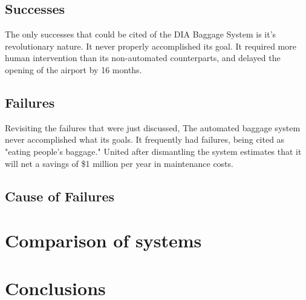 \documentclass[conference]{IEEEtran}
\begin{document}
	\subsection{Successes}
	The only successes that could be cited of the DIA Baggage System is it's revolutionary nature. It never properly accomplished its goal. It required more human intervention than its non-automated counterparts, and delayed the opening of the airport by 16 months.
	\subsection{Failures}
	Revisiting the failures that were just discussed, The automated baggage system never accomplished what its goals. It frequently had failures, being cited as "eating people's baggage."\cite{dia_calleam} United after dismantling the system estimates that it will net a savings of \$1 million per year in maintenance costs.\cite{dia_nbc} 
	\subsection{Cause of Failures}

\section{Comparison of systems}

\section{Conclusions}



\end{document}
